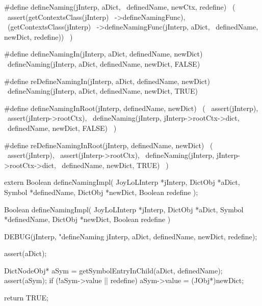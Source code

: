#define defineNaming(jInterp, aDict,      \
  definedName, newCtx, redefine)          \
  (                                       \
    assert(getContextsClass(jInterp)      \
      ->defineNamingFunc),                \
    (getContextsClass(jInterp)            \
      ->defineNamingFunc(jInterp, aDict,  \
        definedName, newDict, redefine))  \
  )

#define defineNamingIn(jInterp, aDict, definedName, newDict)  \
  defineNaming(jInterp, aDict, definedName, newDict, FALSE)

#define reDefineNamingIn(jInterp, aDict, definedName, newDict)  \
  defineNaming(jInterp, aDict, definedName, newDict, TRUE)

#define defineNamingInRoot(jInterp, definedName, newDict) \
  (                                                       \
    assert(jInterp),                                      \
    assert(jInterp->rootCtx),                             \
    defineNaming(jInterp, jInterp->rootCtx->dict,         \
      definedName, newDict, FALSE)                        \
  )

#define reDefineNamingInRoot(jInterp, definedName, newDict) \
  (                                                         \
    assert(jInterp),                                        \
    assert(jInterp->rootCtx),                               \
    defineNaming(jInterp, jInterp->rootCtx->dict,           \
      definedName, newDict, TRUE)                           \
  )
\stopCHeader

\setCHeaderStream{private}
\startCHeader
extern Boolean defineNamingImpl(
  JoyLoLInterp *jInterp,
  DictObj      *aDict,
  Symbol       *definedName,
  DictObj      *newDict,
  Boolean       redefine
);
\stopCHeader
\setCHeaderStream{public}

\startCCode
Boolean defineNamingImpl(
  JoyLoLInterp *jInterp,
  DictObj      *aDict,
  Symbol       *definedName,
  DictObj      *newDict,
  Boolean       redefine
) {
  DEBUG(jInterp, "defineNaming %
        jInterp, aDict, definedName, newDict, redefine);

  assert(aDict);
  
  DictNodeObj* aSym = getSymbolEntryInChild(aDict, definedName);
  assert(aSym);
  if (!aSym->value || redefine) {
    aSym->value   = (JObj*)newDict;
  }

  return TRUE;
}
\stopCCode

